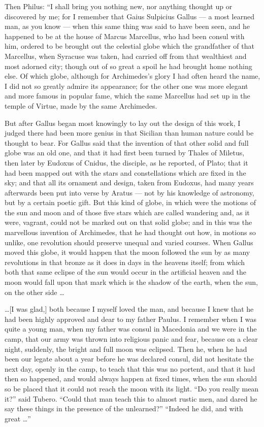  Then Philus: ``I shall bring you nothing new, nor anything thought up or discovered by me; for I remember that Gaius Sulpicius Gallus --- a most learned man, as you know --- when this same thing was said to have been seen, and he happened to be at the house of Marcus Marcellus, who had been consul with him, ordered to be brought out the celestial globe which the grandfather of that Marcellus, when Syracuse was taken, had carried off from that wealthiest and most adorned city; though out of so great a spoil he had brought home nothing else. Of which globe, although for Archimedes's glory I had often heard the name, I did not so greatly admire its appearance; for the other one was more elegant and more famous in popular fame, which the same Marcellus had set up in the temple of Virtue, made by the same Archimedes.

 But after Gallus began most knowingly to lay out the design of this work, I judged there had been more genius in that Sicilian than human nature could be thought to bear. For Gallus said that the invention of that other solid and full globe was an old one, and that it had first been turned by Thales of Miletus, then later by Eudoxus of Cnidus, the disciple, as he reported, of Plato; that it had been mapped out with the stars and constellations which are fixed in the sky; and that all its ornament and design, taken from Eudoxus, had many years afterwards been put into verse by Aratus --- not by his knowledge of astronomy, but by a certain poetic gift. But this kind of globe, in which were the motions of the sun and moon and of those five stars which are called wandering and, as it were, vagrant, could not be marked out on that solid globe; and in this was the marvellous invention of Archimedes, that he had thought out how, in motions so unlike, one revolution should preserve unequal and varied courses. When Gallus moved this globe, it would happen that the moon followed the sun by as many revolutions in that bronze as it does in days in the heavens itself; from which both that same eclipse of the sun would occur in the artificial heaven and the moon would fall upon that mark which is the shadow of the earth, when the sun, on the other side \ldots

 \ldots [I was glad,] both because I myself loved the man, and because I knew that he had been highly approved and dear to my father Paulus. I remember when I was quite a young man, when my father was consul in Macedonia and we were in the camp, that our army was thrown into religious panic and fear, because on a clear night, suddenly, the bright and full moon was eclipsed. Then he, when he had been our legate about a year before he was declared consul, did not hesitate the next day, openly in the camp, to teach that this was no portent, and that it had then so happened, and would always happen at fixed times, when the sun should so be placed that it could not reach the moon with its light. ``Do you really mean it?'' said Tubero. ``Could that man teach this to almost rustic men, and dared he say these things in the presence of the unlearned?'' ``Indeed he did, and with great \ldots''

